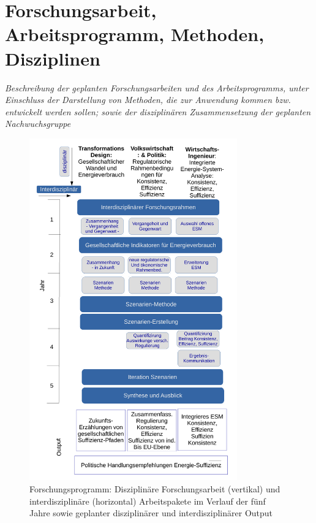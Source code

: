 \documentclass[a4paper,11pt,twoside]{scrartcl}
\begin{document}
\section{Forschungsarbeit, Arbeitsprogramm, Methoden, Disziplinen}
\textit{Beschreibung der geplanten Forschungsarbeiten und des Arbeitsprogramms, unter Einschluss der Darstellung von Methoden, die zur Anwendung kommen bzw. entwickelt werden sollen; sowie der disziplinären Zusammensetzung der geplanten Nachwuchsgruppe}


\begin{figure}[!h]
    \centering
    \includegraphics[width=0.8\textwidth]{figures/Forschungsarbeit.pdf}
    \caption{Forschungsprogramm: Disziplinäre Forschungsarbeit (vertikal) und  interdisziplinäre (horizontal) Arbeitspakete im Verlauf der fünf Jahre sowie geplanter disziplinärer und interdisziplinärer Output}
    \label{fig:forschungsprogramm}
\end{figure}
\end{document}
